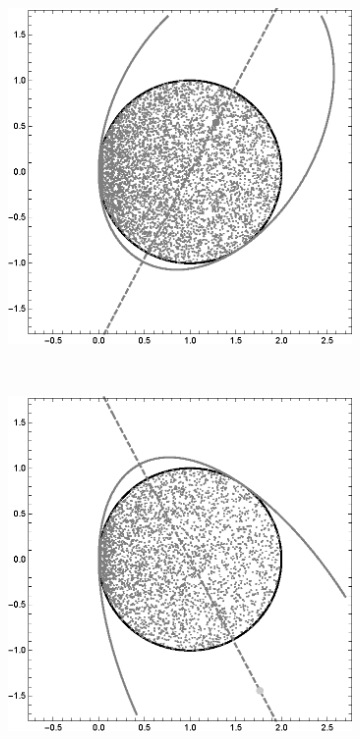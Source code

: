\documentclass[a4paper]{article}
\begin{document}
\begin{figure}
    \centering
    \begin{subfigure}[b]{0.3\textwidth}
        \includegraphics[width=\textwidth]{dumb_angle_a}
        \label{fig:dumb_angle_a}
    \end{subfigure}
    ~ %
    \begin{subfigure}[b]{0.3\textwidth}
        \includegraphics[width=\textwidth]{dumb_angle_b}

\end{subfigure}
\end{figure}
\end{document}
